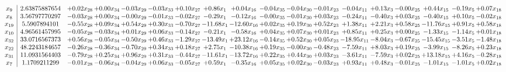 \documentclass[9pt]{article}
\begin{document}
 \[\begin{array}{c| c c@{\hskip 2pt} c@{\hskip 2pt} c@{\hskip 2pt} c@{\hskip 2pt} c@{\hskip 2pt} c@{\hskip 2pt} c@{\hskip 2pt} c@{\hskip 2pt} c@{\hskip 2pt} c@{\hskip 2pt} c@{\hskip 2pt} c@{\hskip 2pt} c@{\hskip 2pt} c@{\hskip 2pt} c@{\hskip 2pt} c@{\hskip 2pt} }
 x_{9}   &  2.63875887654 & +  0.02 x_{28} & +  0.00 x_{34} & -0.03 x_{29} & -0.03 x_{33} & +  0.10 x_{27} & +  0.86 x_{1} & +  0.04 x_{16} & -0.04 x_{35} & -0.04 x_{30} & -0.01 x_{23} & -0.04 x_{11} & +  0.13 x_{3} & -0.00 x_{25} & +  0.44 x_{15} & -0.19 x_{5} & +  0.07 x_{18}\\
 x_{8}   &  3.56797770297 & -0.03 x_{28} & +  0.00 x_{34} & -0.00 x_{29} & -0.01 x_{33} & -0.02 x_{27} & -0.29 x_{1} & -0.12 x_{16} & -0.00 x_{35} & -0.01 x_{30} & +  0.03 x_{23} & -0.24 x_{11} & -0.40 x_{3} & +  0.03 x_{25} & -0.40 x_{15} & +  0.10 x_{5} & -0.02 x_{18}\\
 x_{19}   &  5.5907894101 & -0.55 x_{28} & +  0.09 x_{34} & +  0.54 x_{29} & +  0.30 x_{33} & -0.70 x_{27} & -11.68 x_{1} & -12.60 x_{16} & +  0.02 x_{35} & +  0.19 x_{30} & +  0.52 x_{23} & +  1.38 x_{11} & +  2.21 x_{3} & +  0.58 x_{25} & -11.76 x_{15} & +  0.91 x_{5} & +  0.58 x_{18}\\
 x_{10}   &  4.96561457995 & -0.05 x_{28} & -0.03 x_{34} & +  0.01 x_{29} & +  0.06 x_{33} & -0.14 x_{27} & -0.21 x_{1} & -0.58 x_{16} & +  0.04 x_{35} & +  0.07 x_{30} & +  0.01 x_{23} & +  0.85 x_{11} & +  0.25 x_{3} & +  0.00 x_{25} & -1.33 x_{15} & -1.14 x_{5} & +  0.01 x_{18}\\
 x_{32}   &  33.0716567373 & +  0.56 x_{28} & -0.05 x_{34} & -0.50 x_{29} & +  0.46 x_{33} & -1.29 x_{27} & -13.49 x_{1} & + 23.12 x_{16} & -0.14 x_{35} & +  0.52 x_{30} & +  0.05 x_{23} & -18.95 x_{11} & -8.04 x_{3} & -0.67 x_{25} & -15.45 x_{15} & -3.51 x_{5} & -1.48 x_{18}\\
 x_{22}   &  48.2243184657 & -0.26 x_{28} & -0.36 x_{34} & -0.70 x_{29} & +  0.34 x_{33} & +  0.18 x_{27} & +  2.75 x_{1} & -10.38 x_{16} & +  0.19 x_{35} & -0.00 x_{30} & -0.48 x_{23} & -7.59 x_{11} & +  8.03 x_{3} & +  0.19 x_{25} & -3.99 x_{15} & -8.26 x_{5} & +  0.23 x_{18}\\
 x_{31}   &  11.0931564403 & -0.79 x_{28} & +  0.25 x_{34} & +  0.96 x_{29} & +  0.31 x_{33} & -0.44 x_{27} & -11.61 x_{1} & -13.72 x_{16} & +  0.22 x_{35} & +  0.44 x_{30} & +  0.03 x_{23} & -3.61 x_{11} & -7.59 x_{3} & +  0.02 x_{25} & + 13.18 x_{15} & +  4.16 x_{5} & -0.28 x_{18}\\
 x_{7}   &  1.1709211299 & -0.01 x_{28} & -0.06 x_{34} & -0.04 x_{29} & +  0.06 x_{33} & -0.05 x_{27} & +  0.59 x_{1} & -0.35 x_{16} & +  0.05 x_{35} & +  0.02 x_{30} & -0.03 x_{23} & +  0.93 x_{11} & +  0.48 x_{3} & -0.01 x_{25} & -1.01 x_{15} & -1.01 x_{5} & +  0.02 x_{18}\\

\end{array}\]
\end{document}
